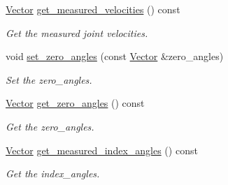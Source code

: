 \begin{DoxyCompactItemize}
\hyperlink{classblmc__robots_1_1SpiJointModules_a2d48f81ec41a42a240e80cd22d4fa2f8}{Vector} \hyperlink{classblmc__robots_1_1SpiJointModules_ac10cd91cd438709076773fc9305adf54}{get\+\_\+measured\+\_\+velocities} () const 
\begin{DoxyCompactList}\small\item\em Get the measured joint velocities. \end{DoxyCompactList}\item 
void \hyperlink{classblmc__robots_1_1SpiJointModules_a9b6c71b98d4738e1167daf1baa443400}{set\+\_\+zero\+\_\+angles} (const \hyperlink{classblmc__robots_1_1SpiJointModules_a2d48f81ec41a42a240e80cd22d4fa2f8}{Vector} \&zero\+\_\+angles)
\begin{DoxyCompactList}\small\item\em Set the zero\+\_\+angles. \end{DoxyCompactList}\item 
\hyperlink{classblmc__robots_1_1SpiJointModules_a2d48f81ec41a42a240e80cd22d4fa2f8}{Vector} \hyperlink{classblmc__robots_1_1SpiJointModules_a9416773977d42f3863b1bf81befe4c18}{get\+\_\+zero\+\_\+angles} () const 
\begin{DoxyCompactList}\small\item\em Get the zero\+\_\+angles. \end{DoxyCompactList}\item 
\hyperlink{classblmc__robots_1_1SpiJointModules_a2d48f81ec41a42a240e80cd22d4fa2f8}{Vector} \hyperlink{classblmc__robots_1_1SpiJointModules_a000596ea1cca674761d67daa57bbde24}{get\+\_\+measured\+\_\+index\+\_\+angles} () const 
\begin{DoxyCompactList}\small\item\em Get the index\+\_\+angles. \end{DoxyCompactList}\end{DoxyCompactItemize}
